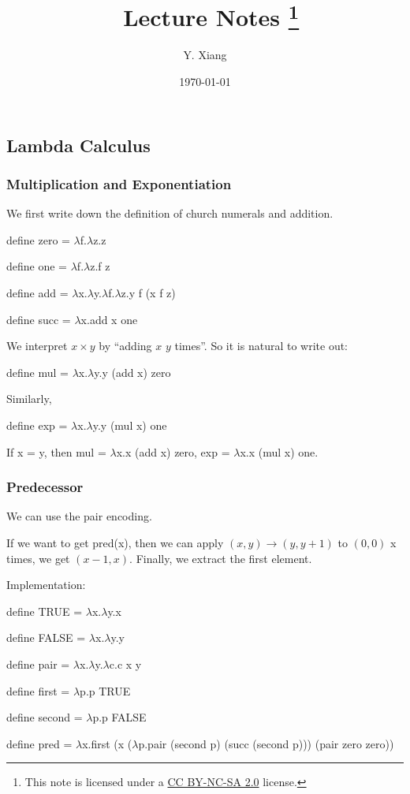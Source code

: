 \documentclass{article}
\title{\vspace{-3em}\course\, Lecture Notes \asnum\footnote{This note is licensed under a \href{https://creativecommons.org/licenses/by-nc-sa/2.0/}{CC BY-NC-SA 2.0} license.}}
\author{Y. Xiang\vspace{1em}}
\date{\today\vspace{-1em}}
\theoremstyle{definition}
\begin{document}
\maketitle
\subsection{Lambda Calculus}

\subsubsection*{Multiplication and Exponentiation}
We first write down the definition of church numerals and addition.

\begin{tcolorbox}
    \textsf{define} zero = $\lambda$f.$\lambda$z.z

    \textsf{define} one = $\lambda$f.$\lambda$z.f z

    \textsf{define} add = $\lambda$x.$\lambda$y.$\lambda$f.$\lambda$z.y f (x f z)

    \textsf{define} succ = $\lambda$x.add x one
\end{tcolorbox}

We interpret $x\times y$ by ``adding $x$ $y$ times''. So it is natural to write out:

\begin{tcolorbox}
    \textsf{define} mul = $\lambda$x.$\lambda$y.y (add x) zero
\end{tcolorbox}

Similarly,

\begin{tcolorbox}
    \textsf{define} exp = $\lambda$x.$\lambda$y.y (mul x) one
\end{tcolorbox}

If x = y, then mul = $\lambda$x.x (add x) zero, exp = $\lambda$x.x (mul x) one.

\subsubsection*{Predecessor}

We can use the \textsf{pair} encoding.

If we want to get \textsf{pred}(x), then we can apply $(x, y) \rightarrow (y, y+1)$ to $(0, 0)$ x times, we get $(x-1,x)$.
Finally, we extract the first element.

Implementation:

\begin{tcolorbox}
    \textsf{define} TRUE = $\lambda$x.$\lambda$y.x

    \textsf{define} FALSE = $\lambda$x.$\lambda$y.y

    \textsf{define} pair = $\lambda$x.$\lambda$y.$\lambda$c.c x y

    \textsf{define} first = $\lambda$p.p TRUE

    \textsf{define} second = $\lambda$p.p FALSE

    \textsf{define} pred = $\lambda$x.first (x ($\lambda$p.pair (second p) (succ (second p))) (pair zero zero))
\end{tcolorbox}
\end{document}
